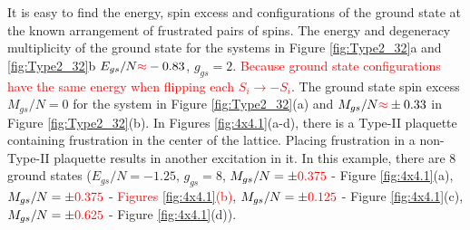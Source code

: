 \documentclass[preprint,12pt]{elsarticle}
\begin{document}
	
	It is easy to find the energy, spin excess and configurations of the ground state at the known arrangement of frustrated pairs of spins. The energy and degeneracy multiplicity of the ground state for the systems in Figure \ref{fig:Type2_32}a and \ref{fig:Type2_32}b $E_{gs}/N\textcolor{red}{\approx}-0.83$, $g_{gs}=2$. \textcolor{red}{Because ground state configurations have the same energy when flipping each $S_i \rightarrow -S_i$}. The ground state spin excess $M_{gs}/N=0$ for the system in Figure \ref{fig:Type2_32}(a) and $M_{gs}/N\textcolor{red}{\approx}\pm 0.33$ in Figure \ref{fig:Type2_32}(b).
	In Figures \ref{fig:4x4.1}(a-d), there is a Type-II plaquette containing frustration in the center of the lattice. Placing frustration in a non-Type-II plaquette results in another excitation in it. In this example, there are 8 ground states ($E_{gs}/N=-1.25$, $g_{gs}=8$, $M_{gs}/N=\pm\textcolor{red}{0.375}$ - Figure \ref{fig:4x4.1}(a), $M_{gs}/N=\pm \textcolor{red}{0.375}$ - \textcolor{red}{Figures \ref{fig:4x4.1}(b)}, $M_{gs}/N=\pm \textcolor{red}{0.125}$ - Figure \ref{fig:4x4.1}(c), $M_{gs}/N=\pm \textcolor{red}{0.625}$ - Figure \ref{fig:4x4.1}(d)). 
	
\end{document}
